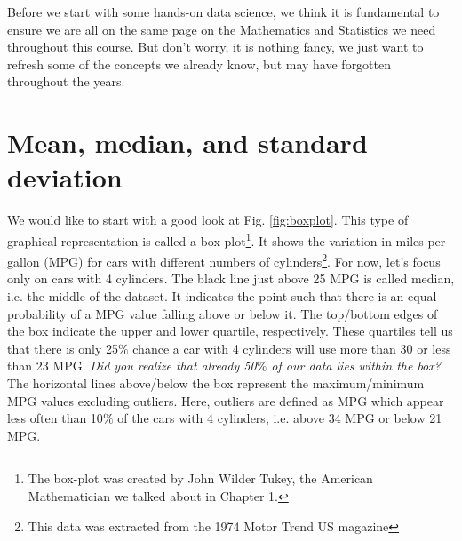 Before we start with some hands-on data science, we think it is fundamental to ensure we are all on the same page on the Mathematics and Statistics we need throughout this course. But don't worry, it is nothing fancy, we just want to refresh some of the concepts we already know, but may have forgotten throughout the years.

\section{Mean, median, and standard deviation}

We would like to start with a good look at Fig. \ref{fig:boxplot}. This type of graphical representation is called a box-plot\footnote{The box-plot was created by John Wilder Tukey, the American Mathematician we talked about in Chapter 1.}. It shows the variation in miles per gallon (MPG) for cars with different numbers of cylinders\footnote{This data was extracted from the 1974 Motor Trend US magazine}. For now, let's focus only on cars with 4 cylinders. The black line just above 25 MPG is called median, i.e. the middle of the dataset. It indicates the point such that there is an equal probability of a MPG value falling above or below it. The top/bottom edges of the box indicate the upper and lower quartile, respectively. These quartiles tell us that there is only 25$\%$ chance a car with 4 cylinders will use more than 30 or less than 23 MPG. \textit{Did you realize that already 50$\%$ of our data lies within the box?} The horizontal lines above/below the box represent the maximum/minimum MPG values excluding outliers. Here, outliers are defined as MPG which appear less often than 10$\%$ of the cars with 4 cylinders, i.e. above 34 MPG or below 21 MPG.

